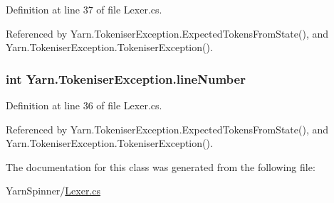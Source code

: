 Definition at line 37 of file Lexer.\-cs.



Referenced by Yarn.\-Tokeniser\-Exception.\-Expected\-Tokens\-From\-State(), and Yarn.\-Tokeniser\-Exception.\-Tokeniser\-Exception().

\hypertarget{a00176_a54b936d7b4f26f88a07a66c5fc1d1ad1}{
\subsubsection[{line\-Number}]{\setlength{\rightskip}{0pt plus 5cm}int Yarn.\-Tokeniser\-Exception.\-line\-Number}}\label{a00176_a54b936d7b4f26f88a07a66c5fc1d1ad1}


Definition at line 36 of file Lexer.\-cs.



Referenced by Yarn.\-Tokeniser\-Exception.\-Expected\-Tokens\-From\-State(), and Yarn.\-Tokeniser\-Exception.\-Tokeniser\-Exception().



The documentation for this class was generated from the following file\-:\begin{DoxyCompactItemize}
\item 
Yarn\-Spinner/\hyperlink{a00313}{Lexer.\-cs}\end{DoxyCompactItemize}
